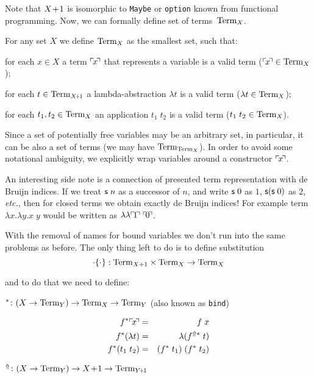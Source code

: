 Note that $X\!+\!1$ is isomorphic to \texttt{Maybe} or \texttt{option}
known from functional programming.
Now, we can formally define set of terms~$\mathrm{Term}_{X}$.

\begin{defin}
  For any set $X$ we define $\mathrm{Term}_{X}$ as the smallest set, such that:
  \begin{thmenumerate}
  \item for each $x \in X$ a term $\ulcorner\! x \!\urcorner$ that represents a variable
    is a valid term ($\ulcorner\! x \!\urcorner \in \mathrm{Term}_{X}$);
  \item for each $t \in \mathrm{Term}_{X\!+\!1}$
    a lambda-abstraction $\lambda t$ is a valid term ($\lambda t \in \mathrm{Term}_{X}$);
  \item for each $t_1,t_2 \in \mathrm{Term}_{X}$ an application $t_1\;t_2$
    is a valid term ($t_1\;t_2 \in \mathrm{Term}_{X}$).
  \end{thmenumerate}
\end{defin}

Since a set of potentially free variables may be an arbitrary set,
in particular, it can be also a set of terms (we may have $\mathrm{Term}_{\mathrm{Term}_{X}}$).
In order to avoid some notational ambiguity, we explicitly wrap variables around
a constructor $\ulcorner\! x \!\urcorner$.

An interesting side note is a connection of presented term representation with
de Bruijn indices.
If we treat $\mathsf{s}\;n$ as a successor of $n$, and write $\mathsf{s}\;0$ as $1$,
$\mathsf{s}(\mathsf{s}\;0)$ as $2$, \emph{etc.},
then for closed terms we obtain exactly de Bruijn indices!
For example term $\lambda x.\lambda y. x\;y$
would be written as $\lambda\lambda \ulcorner\! 1 \!\urcorner\;\ulcorner\! 0 \!\urcorner$.

With the removal of names for bound variables we don't run into the same problems as before.
The only thing left to do is to define substitution
\[
	\cdot\{\cdot\}:
  \mathrm{Term}_{X+1} \times \mathrm{Term}_{X} \to \mathrm{Term}_{X}
\]

and to do that we need to define:

$^* \colon (X \to \mathrm{Term}_{Y}) \to \mathrm{Term}_{X} \to \mathrm{Term}_{Y}$ (also known as \texttt{bind})

\begin{eqnarray*}
  f^*\ulcorner\! x \!\urcorner   & = & f\;x \\
  f^*(\lambda t) & = & \lambda (f^{\Uparrow*} \; t) \\
  f^*(t_1\;t_2)  & = & (f^* \; t_1) \; (f^* \; t_2)
\end{eqnarray*}

$^\Uparrow \colon (X \to \mathrm{Term}_{Y}) \to X\!+\!1 \to \mathrm{Term}_{Y\!+\!1}$

